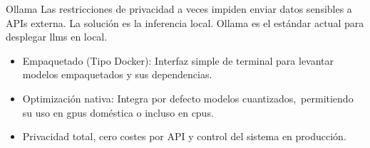 \begin{frame}{Ollama}
Las restricciones de privacidad a veces impiden enviar datos sensibles a APIs externa. La solución es la inferencia local. \alert{Ollama} \cite{Ollama_2023} es el estándar actual para desplegar \glspl{llm} en local.
\begin{itemize}
    \item \alert{Empaquetado (Tipo Docker):} Interfaz simple de terminal para levantar modelos empaquetados y sus dependencias.
    \item \alert{Optimización nativa:} Integra por defecto modelos cuantizados,\ permitiendo su uso en \alert{\glspl{gpu} doméstica o incluso en \glspl{cpu}}.
    \item \alert{Privacidad total}, \alert{cero costes} por API y \alert{control} del sistema en producción.
\end{itemize}
\end{frame}


